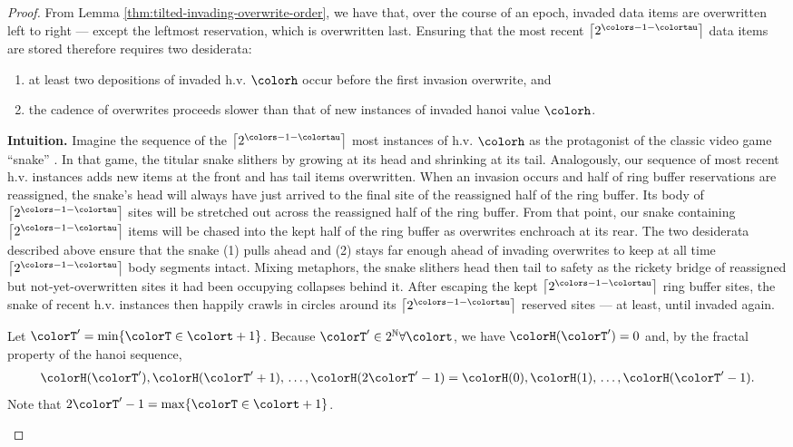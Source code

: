\begin{proof}
From Lemma \ref{thm:tilted-invading-overwrite-order}, we have that, over the course of an epoch, invaded data items are overwritten left to right --- except the leftmost reservation, which is overwritten last.
Ensuring that the most recent $\left\lceil 2^{\colors - 1 - \colortau} \right\rceil$ data items are stored therefore requires two desiderata:
\begin{enumerate}
\item at least two depositions of invaded h.v. $\colorh$ occur before the first invasion overwrite, and
\item the cadence of overwrites proceeds slower than that of new instances of invaded hanoi value $\colorh$.
\end{enumerate}


\begin{mybox}
\textbf{Intuition.}
Imagine the sequence of the $\left\lceil 2^{\colors - 1 - \colortau} \right\rceil$ most instances of h.v. $\colorh$ as the protagonist of the classic video game ``snake'' \citep{de2016complexity}.
In that game, the titular snake slithers by growing at its head and shrinking at its tail.
Analogously, our sequence of most recent h.v. instances adds new items at the front and has tail items overwritten.
When an invasion occurs and half of ring buffer reservations are reassigned, the snake's head will always have just arrived to the final site of the reassigned half of the ring buffer.
Its body of $\left\lceil 2^{\colors - 1 - \colortau} \right\rceil$ sites will be stretched out across the reassigned half of the ring buffer.
From that point, our snake containing $\left\lceil 2^{\colors - 1 - \colortau} \right\rceil$ items will be chased into the kept half of the ring buffer as overwrites enchroach at its rear.
The two desiderata described above ensure that the snake (1) pulls ahead and (2) stays far enough ahead of invading overwrites to keep at all time $\left\lceil 2^{\colors - 1 - \colortau} \right\rceil$ body segments intact.
Mixing metaphors, the snake slithers head then tail to safety as the rickety bridge of reassigned but not-yet-overwritten sites it had been occupying collapses behind it.
After escaping the kept $\left\lceil 2^{\colors - 1 - \colortau} \right\rceil$ ring buffer sites, the snake of recent h.v. instances then happily crawls in circles around its $\left\lceil 2^{\colors - 1 - \colortau} \right\rceil$ reserved sites --- at least, until invaded again.
\end{mybox}

\begin{proofpart}
Let $\colorT' = \min\{\colorT \in \colort + 1\}$.
Because $\colorT' \in 2^{\mathbb{N}} \forall \colort$, we have $\colorH(\colorT') = 0$ and, by the fractal property of the hanoi sequence,
\begin{align*}
\colorH(\colorT'), \colorH(\colorT'+1), \,\ldots, \colorH(2\colorT' - 1) = \colorH(0), \colorH(1), \,\ldots, \colorH(\colorT' - 1).
\end{align*}
Note that $2\colorT' - 1 = \max\{\colorT \in \colort + 1\}$.


\end{proofpart}
\end{proof}
